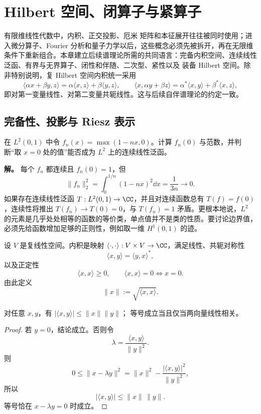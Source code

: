 \chapter{Hilbert 空间、闭算子与紧算子}\label{ch:ms-hilbert-operators}\label{chap:hilbert-space} \label{chap:math-hilbert}

有限维线性代数中，内积、正交投影、厄米 矩阵和本征展开往往被同时使用；进入微分算子、Fourier 分析和量子力学以后，这些概念必须先被拆开，再在无限维条件下重新组合。本章建立后续谱理论所需的共同语言：完备内积空间、连续线性泛函、有界与无界算子、闭性和伴随、二次型、紧性以及 装备 Hilbert 空间。除非特别说明，复 Hilbert 空间内积统一采用
\[
{\langle \alpha x+\beta y,z\rangle
=\alpha\langle x,z\rangle+\beta\langle y,z\rangle},
\qquad
\langle x,\alpha y+\beta z\rangle
=\alpha^*\langle x,y\rangle+\beta^*\langle x,z\rangle,
\]
即对第一变量线性、对第二变量共轭线性。这与后续自伴谱理论的约定一致。



\section{完备性、投影与 Riesz 表示}

\begin{workedexample}[\(L^2\) 函数不能按点取值]
在 \(L^2(0,1)\) 中令 \(f_n(x)=\max(1-nx,0)\)。计算 \(f_n(0)\) 与范数，并判断“取 \(x=0\) 处的值”能否成为 \(L^2\) 上的连续线性泛函。

\textbf{解。} 每个 \(f_n\) 都连续且 \(f_n(0)=1\)，但
\[
\|f_n\|_2^2=\int_0^{1/n}(1-nx)^2\dd x
=\frac1{3n}\longrightarrow0.
\]
如果存在连续线性泛函 \(T:L^2(0,1)\to\CC\)，并且对连续函数总有 \(T(f)=f(0)\)，连续性将推出 \(T(f_n)\to T(0)=0\)，与 \(T(f_n)=1\) 矛盾。更根本地说，\(L^2\) 的元素是几乎处处相等的函数的等价类，单点值并不是类的性质。要讨论边界值，必须先给函数增加足够的正则性，例如取一维 \(H^1(0,1)\) 的迹。
\end{workedexample}

\begin{definition}[内积与诱导范数]
设 $V$ 是复线性空间。内积是映射 $\langle\cdot,\cdot\rangle:V\times V\to\CC$，满足线性、共轭对称性
\[
\langle x,y\rangle=\langle y,x\rangle^*,
\]
以及正定性
\[
\langle x,x\rangle\ge0,
\qquad
\langle x,x\rangle=0\iff x=0.
\]
由此定义
\[
\|x\|:=\sqrt{\langle x,x\rangle}.
\]
\end{definition}

\begin{theorem}
对任意 $x,y$，有 $|\langle x,y\rangle|\le\|x\|\|y\|$；
等号成立当且仅当两向量线性相关。
\end{theorem}
\begin{proof}
若 $y=0$，结论成立。否则令
\[
\lambda=\frac{\langle x,y\rangle}{\|y\|^2}.
\]
则
\[
0\le \|x-\lambda y\|^2
=\|x\|^2-\frac{|\langle x,y\rangle|^2}{\|y\|^2},
\]
所以
\[
{|\langle x,y\rangle|\le \|x\|\,\|y\|}.
\]
等号恰在 $x-\lambda y=0$ 时成立。
\end{proof}

